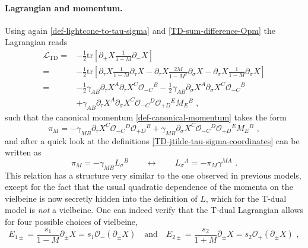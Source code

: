 \documentclass[12pt]{article}
\numberwithin{equation}{section}
\begin{document}
\paragraph{Lagrangian and momentum.} Using again \eqref{def-lightcone-to-tau-sigma} and \eqref{TD-sum-difference-Opm} the Lagrangian reads
\begin{equation}\label{TD-Lagrangian}
\begin{aligned}
\mathcal{L}_{\mathrm{TD}}=&-\tfrac{1}{2}\mathrm{tr}[\partial_{+}X\frac{1}{1-M} \partial_{-}X]
\\
=&-\tfrac{1}{2}\mathrm{tr}[\partial_{\tau}X\frac{1}{1-M} \partial_{\tau}X-\partial_{\tau}X\frac{2M}{1-M^2} \partial_{\sigma}X-\partial_{\sigma}X\frac{1}{1-M} \partial_{\sigma}X]
\\
=&-\tfrac{1}{2}\gamma_{AB}\partial_{\tau}X^{A}\partial_{\tau}X^{C}\mathcal{O}_{-C}{}^{B}-\tfrac{1}{2}\gamma_{AB}\partial_{\sigma}X^{A}\partial_{\sigma}X^{C}\mathcal{O}_{-C}{}^{B}
\\
&+\gamma_{AB}\partial_{\tau}X^{A}\partial_{\sigma}X^{C}\mathcal{O}_{-C}{}^{D}\mathcal{O}_{+D}{}^{E}M_{E}{}^{B} \,\, ,
\end{aligned}
\end{equation}
such that the canonical momentum \eqref{def-canonical-momentum} takes the form
\begin{equation}
\pi_{M}=-\gamma_{MB}\partial_{\tau}X^{C}\mathcal{O}_{-C}{}^{D}\mathcal{O}_{+D}{}^{B}+\gamma_{MB}\partial_{\sigma}X^{C}\mathcal{O}_{-C}{}^{D}\mathcal{O}_{+D}{}^{E}M_{E}{^{B}} \,\, ,
\end{equation}
and after a quick look at the definitions \eqref{TD-jtilde-tau-sigma-coordinates} can be written as
\begin{equation}\label{TD-momentum-jtilde-relation}
\pi_{M}=-\gamma_{MB}L_{\sigma}{}^{B}
\qquad \longleftrightarrow \qquad
L_{\sigma}{}^{A}=-\pi_{M}\gamma^{MA} \,\, .
\end{equation}
This relation has a structure very similar to the one observed in previous models, except for the fact that the usual quadratic dependence of the momenta on the vielbeine is now secretly hidden into the definition of $L$, which for the T-dual model is \emph{not} a vielbeine. One can indeed verify that the T-dual Lagrangian allows for four possible choices of vielbeine,
\begin{equation}\label{TD-vielbeine}
E_{1\pm}=\frac{s_{1}}{1-M}\partial_{\pm}X=s_{1}\mathcal{O}_{-}(\partial_{\pm}X) 
\quad \text{and} \quad
E_{2\pm}=\frac{s_{2}}{1+M}\partial_{\pm}X =s_{2}\mathcal{O}_{+}(\partial_{\pm}X) \,\, ,
\end{equation}
\end{document}
